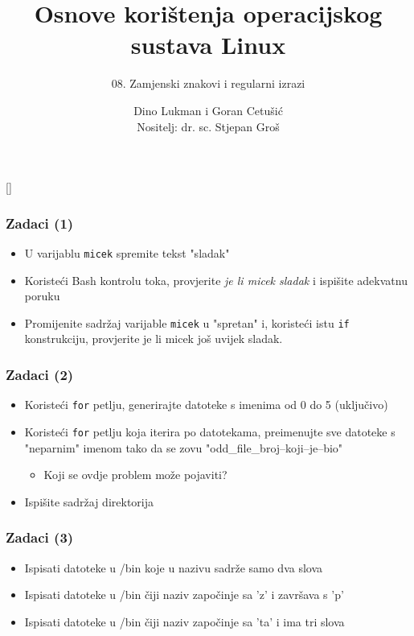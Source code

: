 \documentclass[table,usenames,dvipsnames]{beamer}
\title{Osnove korištenja operacijskog sustava Linux}
\subtitle{08. Zamjenski znakovi i regularni izrazi}
\author[Dino Lukman i Goran Cetušić]{Dino Lukman i Goran Cetušić\\{\small Nositelj: dr. sc. Stjepan Groš}}
\institute[FER]{Sveučilište u Zagrebu \\
				Fakultet elektrotehnike i računarstva}
\date{\todayiso}
\newcommand{\shell}[1]{\texttt{#1}}
\begin{document}
{
[] %

\begin{frame}
\maketitle
\end{frame}
}


\begin{frame}[t]
\frametitle{Zadaci (1)}
\begin{itemize}
  \item U varijablu \shell{micek} spremite tekst "sladak"
  \item Koristeći Bash kontrolu toka, provjerite \textit{je li micek sladak} i ispišite adekvatnu poruku
  \item Promijenite sadržaj varijable \shell{micek} u "spretan" i, koristeći istu \shell{if} konstrukciju, provjerite je li micek još uvijek sladak.
\end{itemize}
\end{frame}

\begin{frame}[t]
\frametitle{Zadaci (2)}
  \begin{itemize}
    \item Koristeći \shell{for} petlju, generirajte datoteke s imenima od 0 do 5 (uključivo)
    \item Koristeći \shell{for} petlju koja iterira po datotekama, preimenujte sve datoteke s "neparnim" imenom tako da se zovu "odd\_file\_broj--koji--je--bio"
    \begin{itemize}
      \item Koji se ovdje problem može pojaviti?
    \end{itemize}
    \item Ispišite sadržaj direktorija
  \end{itemize}
\end{frame}



\begin{frame}[t]
\frametitle{Zadaci (3)}
\begin{itemize}
  \item Ispisati datoteke u /bin koje u nazivu sadrže samo dva slova
  \item Ispisati datoteke u /bin čiji naziv započinje sa 'z' i završava s 'p'
  \item Ispisati datoteke u /bin čiji naziv započinje sa 'ta' i ima tri slova
\end{itemize}
\end{frame}
\end{document}
